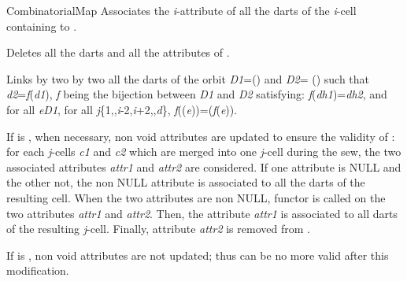 \begin{ccRefConcept}{CombinatorialMap}
   {Associates the \emph{i}-attribute of all the darts of the \emph{i}-cell 
     containing  to .
  }

   {Deletes all the darts and all the attributes of .}
\ccOperations

 {Links by \betai{}
  two by two all the darts of the orbit
  \emph{D1}=\orbit{\betaun{},\myldots{},\betaimdeux{},\betaipdeux{},\myldots{},\betad{}}() and
  \emph{D2}=\orbit{\betazero{},\betadeux{},\myldots{},\betaimdeux{},\betaipdeux{},\myldots{},\betad{}}	()
  such that \emph{d2}=\emph{f}(\emph{d1}), \emph{f} being the bijection between \emph{D1} and \emph{D2} 
  satisfying: \emph{f}(\emph{dh1})=\emph{dh2}, and for all \emph{e}\myin{}\emph{D1}, for all 
  \emph{j}\myin{}\{1,\myldots{},\emph{i}-2,\emph{i}+2,\myldots{},\emph{d}\},
  \emph{f}(\betaj{}(\emph{e}))=\betajinv{}(\emph{f}(\emph{e})).

  If  is , when necessary, non void
  attributes are updated to ensure the validity of : for each
  \emph{j}-cells \emph{c1} and \emph{c2} which are merged into one \emph{j}-cell during
  the sew, the two associated attributes \emph{attr1} and \emph{attr2} are
  considered.  If one attribute is
  NULL and the other not, the non NULL attribute is associated to all
  the darts of the resulting cell.  When the two attributes are non
  NULL, functor  is called on
  the two attributes \emph{attr1} and \emph{attr2}. Then, the attribute
  \emph{attr1} is associated to all darts of the resulting
  \emph{j}-cell. Finally, attribute \emph{attr2} is removed from .
  \begin{ccAdvanced}
    If  is , non void attributes are
    not updated; thus  can be no more valid after this
    modification.
  \end{ccAdvanced}
}


\end{ccRefConcept}
